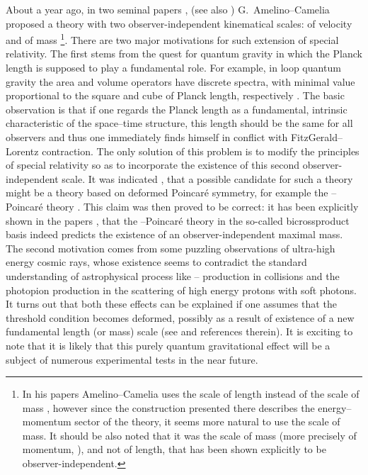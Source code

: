 \documentclass[a4paper,a4paper]{article}
\begin{document}
About a year ago, in two seminal papers \cite{gac1}, \cite{gac2}
(see also \cite{gacnew})  G.~Amelino--Camelia proposed a theory
with two observer-independent kinematical scales: of velocity \coordHE{}
and of mass \myHighlight{$\kappa$}\coordHE{}\footnote{In his papers Amelino--Camelia  uses
the scale of length \myHighlight{$\lambda$}\coordHE{} instead of the scale of mass
\myHighlight{$\kappa$}\coordHE{}, however since the construction presented there describes
the energy--momentum sector of the theory, it seems more natural
to use the scale of mass. It should be also noted that it was the
scale of mass (more precisely of momentum, \coordHE{}), and not of
length, that has been shown explicitly to be
observer-independent.}. There are two major motivations for such
extension of special relativity. The first stems from the quest
for quantum gravity in which the Planck length is supposed to play
a fundamental role. For example, in loop quantum gravity the area
and volume operators have discrete spectra, with minimal value
proportional to the square and cube of Planck length, respectively
\cite{RovSmo}. The basic observation is that if one regards the
Planck length as a fundamental, intrinsic characteristic of the
space--time structure, this length should be the same for all
observers and thus one immediately finds himself in conflict with
FitzGerald--Lorentz contraction. The only solution of this problem
is to modify the principles of special relativity so as to
incorporate the existence of this second observer-independent
scale. It was indicated \cite{gac1}, \cite{gac2} that a possible
candidate for such a theory might be a theory based on deformed
Poincar\'e symmetry, for example the \myHighlight{$\kappa$}\coordHE{}--Poincar\'e theory
\cite{lunoruto, maru, luruto, luruza, luno}. This claim was then
proved to be correct: it has been explicitly shown in the papers
\cite{jkgminl}, \cite{rbgacjkg} that the \myHighlight{$\kappa$}\coordHE{}--Poincar\'e
theory in the so-called bicrossproduct basis indeed predicts the
existence of an observer-independent maximal mass. The second
motivation comes from some puzzling observations of ultra-high
energy cosmic rays, whose existence seems to contradict the
standard understanding of astrophysical process like \coordHE{}-- \coordHE{}
production in \myHighlight{$\gamma\gamma$}\coordHE{} collisions and the photopion
production in the scattering of high energy protons with soft
photons. It turns out that both these effects can be explained if
one assumes that the threshold condition becomes deformed,
possibly as a result of existence of a new fundamental length (or
mass) scale (see \cite{gacpir} and references therein). It is
exciting to note that it is likely that this purely quantum
gravitational effect will be a subject of numerous experimental
tests in the near future.
\end{document}
